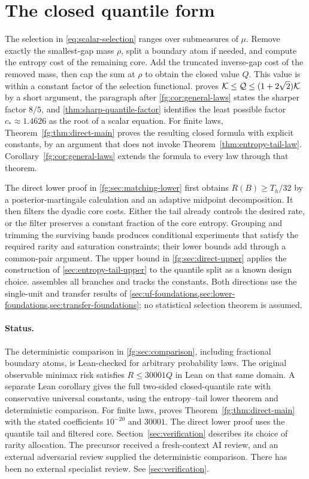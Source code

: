 \section{The closed quantile form}\label{fg:sec:model}
The selection in \eqref{eq:scalar-selection} ranges over submeasures of
$\mu$. Remove exactly the smallest-gap mass $\rho$, split a boundary atom
if needed, and compute the entropy cost of the remaining core. Add the
truncated inverse-gap cost of the removed mass, then cap the sum at $\rho$
to obtain the closed value $Q$.
This value is within a constant factor of the selection functional.
 proves
$\mathcal K\le\mathcal Q\le(1+2\sqrt2)\mathcal K$ by a short argument, the
paragraph after \cref{fg:cor:general-laws} states the sharper factor
$8/5$, and \cref{thm:sharp-quantile-factor} identifies the least possible
factor $c_*\approx1.4626$ as the root of a scalar equation.
For finite laws, Theorem~\ref{fg:thm:direct-main} proves the
resulting closed formula with explicit constants, by an argument that does
not invoke Theorem~\ref{thm:entropy-tail-law}.
Corollary~\ref{fg:cor:general-laws} extends the formula to every law
through that theorem.

The direct lower proof in \cref{fg:sec:matching-lower} first obtains
$R(B)\ge T_h/32$ by a posterior-martingale calculation and an adaptive
midpoint decomposition. It then filters the dyadic core costs. Either
the tail already controls the desired rate, or the filter preserves a
constant fraction of the core entropy. Grouping and trimming the
surviving bands produces conditional experiments that satisfy the
required rarity and saturation constraints; their lower bounds add
through a common-pair argument. The upper bound in
\cref{fg:sec:direct-upper} applies the construction of
\cref{sec:entropy-tail-upper} to the quantile split as a known design
choice.  assembles all branches and
tracks the constants. Both directions use the single-unit and transfer
results of
\cref{sec:uf-foundations,sec:lower-foundations,sec:transfer-foundations};
no statistical selection theorem is assumed.

\paragraph{Status.}
The deterministic comparison in \cref{fg:sec:comparison}, including
fractional boundary atoms, is Lean-checked for arbitrary probability
laws. The original observable minimax risk satisfies $R\le30001Q$ in
Lean on that same domain. A separate Lean corollary gives the full
two-sided closed-quantile rate with conservative universal constants, using
the entropy--tail lower theorem and deterministic comparison. For finite
laws,  proves
Theorem~\ref{fg:thm:direct-main} with the stated coefficients $10^{-20}$ and
$30001$. The direct lower proof uses the quantile tail and filtered core.
Section~\ref{sec:verification} describes its choice of rarity allocation.
The precursor received a fresh-context AI review, and an external
adversarial review supplied the deterministic comparison. There has been
no external specialist review. See \cref{sec:verification}.

